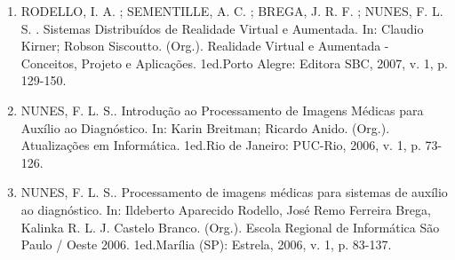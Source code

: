 \documentclass[11pt,a4paper,sans]{moderncv} %
\begin{document}
\begin{enumerate}
    \item RODELLO, I. A. ; SEMENTILLE, A. C. ; BREGA, J. R. F. ; NUNES, F. L. S. . Sistemas Distribuídos de Realidade Virtual e Aumentada. In: Claudio Kirner; Robson Siscoutto. (Org.). Realidade Virtual e Aumentada - Conceitos, Projeto e Aplicações. 1ed.Porto Alegre: Editora SBC, 2007, v. 1, p. 129-150.
    \item NUNES, F. L. S.. Introdução ao Processamento de Imagens Médicas para Auxílio ao Diagnóstico. In: Karin Breitman; Ricardo Anido. (Org.). Atualizações em Informática. 1ed.Rio de Janeiro: PUC-Rio, 2006, v. 1, p. 73-126.
    \item NUNES, F. L. S.. Processamento de imagens médicas para sistemas de auxílio ao diagnóstico. In: Ildeberto Aparecido Rodello, José Remo Ferreira Brega, Kalinka R. L. J. Castelo Branco. (Org.). Escola Regional de Informática São Paulo / Oeste 2006. 1ed.Marília (SP): Estrela, 2006, v. 1, p. 83-137.
\end{enumerate}
\end{document}
